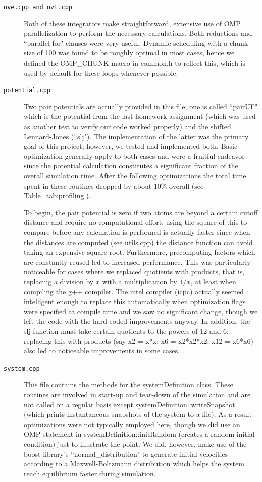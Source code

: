 \documentclass[12pt]{article}
\begin{document}
\begin{description}

\item[\texttt{nve.cpp and nvt.cpp}]
Both of these integrators make straightforward, extensive use of OMP parallelization to perform the necessary calculations.  Both reductions and ``parallel for" clauses were very useful.  Dynamic scheduling with a chunk size of 100 was found to be roughly optimal in most cases, hence we defined the OMP\_CHUNK macro in common.h to reflect this, which is used by default for these loops whenever possible.

\item[\texttt{potential.cpp}]
Two pair potentials are actually provided in this file; one is called ``pairUF" which is the potential from the last homework assignment (which was used as another test to verify our code worked properly) and the shifted Lennard-Jones (``slj").  The implementation of the latter was the primary goal of this project, however, we tested and implemented both.  Basic optimization generally apply to both cases and were a fruitful endeavor since the potential calculation constitutes a significant fraction of the overall simulation time.  After the following optimizations the total time spent in these routines dropped by about 10\% overall (see Table~\ref{tab:profiling}).

To begin, the pair potential is zero if two atoms are beyond a certain cutoff distance and require no computational effort; using the square of this to compare before any calculation is performed is actually faster since when the distances are computed (see utils.cpp) the distance function can avoid taking an expensive square root.  Furthermore, precomputing factors which are constantly reused led to increased performance.  This was particularly noticeable for cases where we replaced quotients with products, that is, replacing a division by $x$ with a multiplication by $1/x$, at least when compiling the g++ compiler.  The intel compiler (icpc) actually seemed intelligent enough to replace this automatically when optimization flags were specified at compile time and we saw no significant change, though we left the code with the hard-coded improvements anyway.  In addition, the slj function must take certain quotients to the powers of 12 and 6; replacing this with products (say x2 = x*x; x6 = x2*x2*x2; x12 = x6*x6) also led to noticeable improvements in some cases.

\item[\texttt{system.cpp}]
This file contains the methods for the systemDefinition class.  These routines are involved in start-up and tear-down of the simulation and are not called on a regular basis except systemDefinition::writeSnapshot (which prints instantaneous snapshots of the system to a file).  As a result optimizations were not typically employed here, though we did use an OMP statement in systemDefinition::initRandom (creates a random initial condition) just to illustrate the point.  We did, however, make use of the boost library's ``normal\_distribution" to generate initial velocities according to a Maxwell-Boltzmann distribution which helps the system reach equilibrium faster during simulation.


\end{description}
\end{document}
